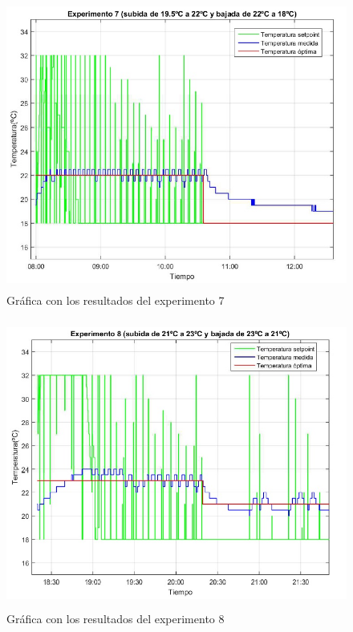 \begin{figure}[H]
\centering
\includegraphics[width=130mm,height=95mm]{imagenes/anexo2/experimento7}
\caption {Gráfica con los resultados del experimento 7}
\label{figA2_3:experimento7}
\end{figure}

\begin{figure}[H]
\centering
\includegraphics[width=130mm,height=95mm]{imagenes/anexo2/experimento8}
\caption {Gráfica con los resultados del experimento 8}
\label{figA2_4:experimento8}
\end{figure}

